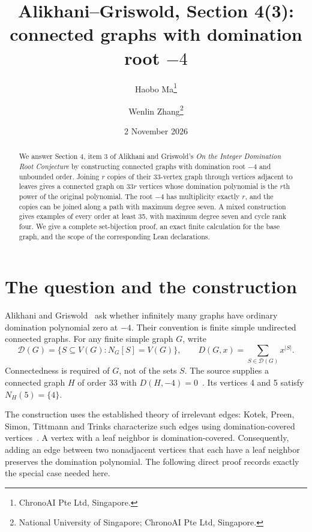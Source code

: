 \documentclass[11pt]{article}
\title{Alikhani--Griswold, Section 4(3):\\connected graphs with domination root $-4$}
\author{Haobo Ma\thanks{ChronoAI Pte Ltd, Singapore.}\and
Wenlin Zhang\thanks{National University of Singapore; ChronoAI Pte Ltd, Singapore.}}
\date{2 November 2026}
\newcommand{\Dom}{\mathcal D}
\newcommand{\base}{H}
\begin{document}
\maketitle
\begin{abstract}
We answer Section 4, item 3 of Alikhani and Griswold's
\emph{On the Integer Domination Root Conjecture} by constructing connected
graphs with domination root $-4$ and unbounded order.
Joining $r$ copies of their 33-vertex graph through vertices adjacent to
leaves gives a connected graph on $33r$ vertices whose domination polynomial
is the $r$th power of the original polynomial. The root $-4$ has multiplicity
exactly $r$, and the copies can be joined along a path with maximum degree
seven. A mixed construction gives examples of every order at least 35,
with maximum degree seven and cycle rank four.
We give a complete set-bijection proof, an exact finite calculation
for the base graph, and the scope of the corresponding Lean declarations.
\end{abstract}

\section{The question and the construction}
Alikhani and Griswold~\cite[Section 4, item 3]{AG} ask whether infinitely
many graphs have ordinary domination polynomial zero at $-4$.
Their convention is finite simple undirected connected graphs.
For any finite simple graph $G$, write
\[
 \Dom(G)=\{S\subseteq V(G):N_G[S]=V(G)\},\qquad
 D(G,x)=\sum_{S\in\Dom(G)}x^{|S|}.
\]
Connectedness is required of $G$, not of the sets $S$.
The source supplies a connected graph $\base$ of order 33 with
$D(\base,-4)=0$~\cite[Theorem 2.1 and Corollary 2.2]{AG}.
Its vertices 4 and 5 satisfy $N_\base(5)=\{4\}$.

The construction uses the established theory of irrelevant edges:
Kotek, Preen, Simon, Tittmann and Trinks characterize such edges using
domination-covered vertices~\cite[Definition 3.9 and Theorem 3.11]{KPSTT}.
A vertex with a leaf neighbor is domination-covered. Consequently,
adding an edge between two nonadjacent vertices that each have a leaf
neighbor preserves the domination polynomial.
The following direct proof records exactly the special case needed here.
\end{document}
